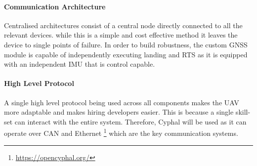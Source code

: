 \paragraph{Communication Architecture}
Centralised architectures consist of a central node directly connected to all the relevant devices. while this is a simple and cost effective method it leaves the device to single points of failure. In order to build robustness, the custom \gls{GNSS} module is capable of independently executing landing and \gls{RTS} as it is equipped with an independent \gls{IMU} that is control capable.  
\paragraph{High Level Protocol}
A single high level protocol being used across all components makes the \gls{UAV} more adaptable and makes hiring developers easier. This is because a single skill-set can interact with the entire system. Therefore, Cyphal will be used as it can operate over \gls{CAN} and Ethernet \footnote{\url{https://opencyphal.org/}} which are the key communication systems. 